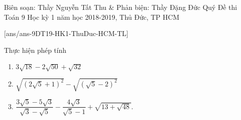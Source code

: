 
\begin{name}
{Biên soạn: Thầy Nguyễn Tất Thu \& Phản biện: Thầy Đặng Đức Quý}
{Đề thi Toán 9 Học kỳ 1 năm học 2018-2019, Thủ Đức, TP HCM }
\end{name}
\setcounter{bt}{0}
[ans/ans-9DT19-HK1-ThuDuc-HCM-TL]
\begin{bt}%
	Thực hiện phép tính
	\begin{enumerate}
		\item $3 \sqrt{18}- 2 \sqrt{50}+ \sqrt{32}$
		\item $\sqrt{(2 \sqrt{5}+ 1)^{2}}- \sqrt{(\sqrt{5}- 2)^{2}}$
		\item $\dfrac{3 \sqrt{5}- 5 \sqrt{3}}{\sqrt{3}- \sqrt{5}}- \dfrac{4 \sqrt{3}}{\sqrt{5} - 1}+ \sqrt{13 + \sqrt{48}}$.
	\end{enumerate}
\end{bt}
